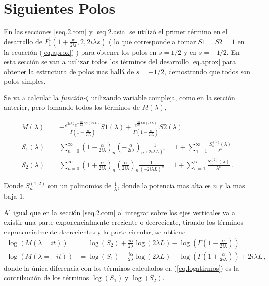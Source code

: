 \section{Siguientes Polos}\label{sec.sig.polos}


En las secciones \ref{seq.2.com} y \ref{seq.2.asin} se utilizó el primer término en el desarrollo de $F _{1} ^{1} \left( 1+\frac{ \alpha}{2 \lambda i },2,2 i \lambda x \right)$ ( lo que corresponde a tomar $S1 = S2 = 1$ en la ecuación (\ref{eq.aprox}) )  para obtener los polos en $s=1/2$ y en $s=-1/2$. En esta sección se van a utilizar todos los términos del desarrollo \ref{eq.aprox} para obtener la estructura de polos mas hallá de $s=-1/2$, demostrando que todos son polos simples. 


Se va a calcular la {\it función-$\zeta$} utilizando variable compleja, como en la sección anterior, pero tomando todos los términos de $M ( \lambda )$,


\begin{align}\label{larga}
M( \lambda ) &= 
-
 \frac{e ^{2 i \lambda L } e ^{ - \frac{i \alpha  }{2 \lambda } Ln \left( 2 \lambda L \right) }  }
      { \Gamma \left( 1 + \frac{ \alpha}{2 i \lambda}  \right) } S1 ( \lambda ) +
 \frac{ e ^{   \frac{i \alpha  } {2 \lambda } Ln \left(2 \lambda L \right) } }
      { \Gamma \left( 1 - \frac{ \alpha}{2 i \lambda}  \right)   } S2 ( \lambda )        
      \\[10pt]      
S _1 ( \lambda ) &= \sum _{n=0} ^{ \infty }
\left(1 - \frac{ \alpha}{2 i \lambda}  \right) _n
\left(- \frac{ \alpha}{2 i \lambda}  \right) _n
\frac{1}{( 2 i \lambda L ) ^n} = 
1 + \sum _{n=1} ^{\infty} \frac{S ^{(1)} _n (\lambda)}{\lambda ^n} 
	\nonumber
	\\[10pt]
S _2 (\lambda ) &= \sum _{n=0 } ^{\infty}
\left( 1 + \frac{ \alpha}{2 i \lambda }  \right) _n
\left( \frac{ \alpha }{2 i \lambda} \right) _n
\frac{1}{( - 2 i \lambda L ) ^n} = 
1 + \sum _{n=1} ^{\infty} \frac{S ^{(2)} _n (\lambda)}{\lambda ^n}
\nonumber
\, .
\end{align}

Donde $S _n ^{(1,2)}$ son un polinomios de $\frac{1}{ \lambda}$, donde la potencia mas alta es $n$ y la mas baja $1$.


Al igual que en la sección \ref{seq.2.com} al integrar sobre los ejes verticales va a existir una parte exponencialmente creciente o decreciente, tirando los términos exponencialmente decrecientes y la parte circular, se obtiene
\begin{align}
\log ( M ( \lambda = i t ) ) &=   \log (S _2) + 
\frac{i \alpha }{2 \lambda}  \log (2 \lambda L) - 
 \log \left( \Gamma \left( 1 - \frac{ \alpha}{2 i \lambda} \right) \right) \\ 
\log ( M ( \lambda=-i t ) ) &=  \log (S _1) -  
\frac{i \alpha }{2 \lambda}  \log ( 2 \lambda L ) - 
 \log \left( \Gamma \left( 1 + \frac{ \alpha}{2 i \lambda} \right) \right) +
2 i \lambda L  \nonumber
	\,	,
\end{align}
donde la única diferencia con los términos calculados en (\ref{eq.logatirmos}) es la contribución de los términos $\log ( S _1 )$ y $ \log ( S _2) $.

